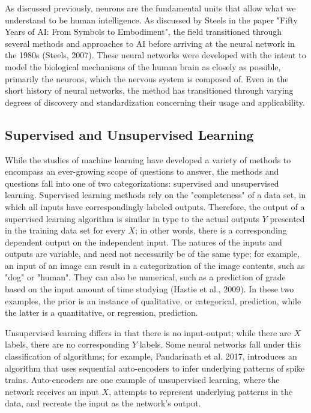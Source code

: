 \documentclass[11pt,titlepage]{article}
\begin{document}
As discussed previously, neurons are the fundamental units that allow what we understand to be human intelligence. As discussed by Steels in the paper "Fifty Years of AI: From Symbols to Embodiment", the field transitioned through several methods and approaches to AI before arriving at the neural network in the 1980s (Steels, 2007). These neural networks were developed with the intent to model the biological mechanisms of the human brain as closely as possible, primarily the neurons, which the nervous system is composed of. Even in the short history of neural networks, the method has transitioned through varying degrees of discovery and standardization concerning their usage and applicability.\par

\subsection{Supervised and Unsupervised Learning}
While the studies of machine learning have developed a variety of methods to encompass an ever-growing scope of questions to answer, the methods and questions fall into one of two categorizations: supervised and unsupervised learning. Supervised learning methods rely on the "completeness" of a data set, in which all inputs have correspondingly labeled outputs. Therefore, the output of a supervised learning algorithm is similar in type to the actual outputs $Y$ presented in the training data set for every $X$; in other words, there is a corresponding dependent output on the independent input. The natures of the inputs and outputs are variable, and need not necessarily be of the same type; for example, an input of an image can result in a categorization of the image contents, such as "dog" or "human". They can also be numerical, such as a prediction of grade based on the input amount of time studying (Hastie et al., 2009). In these two examples, the prior is an instance of qualitative, or categorical, prediction, while the latter is a quantitative, or regression, prediction.\par

Unsupervised learning differs in that there is no input-output; while there are $X$ labels, there are no corresponding $Y$ labels. Some neural networks fall under this classification of algorithms; for example, Pandarinath et al. 2017, introduces an algorithm that uses sequential auto-encoders to infer underlying patterns of spike trains. Auto-encoders are one example of unsupervised learning, where the network receives an input $X$, attempts to represent underlying patterns in the data, and recreate the input as the network's output. 
\end{document}
